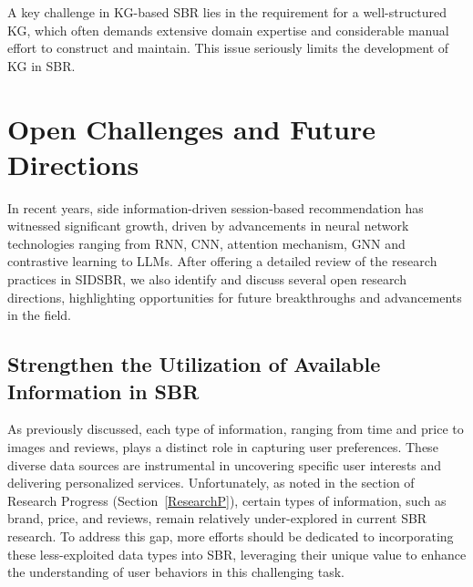 \documentclass[lettersize,journal]{IEEEtran}
\newcommand{\baby}{{SIDSBR}\xspace}
\begin{document}
A key challenge in KG-based SBR lies in the requirement for a well-structured KG, which often demands extensive domain expertise and considerable manual effort to construct and maintain. This issue seriously limits the development of KG in SBR.


\section{Open Challenges and Future Directions}\label{openf}
In recent years, side information-driven session-based recommendation has witnessed significant growth, driven by advancements in neural network technologies ranging from RNN, CNN, attention mechanism, GNN and contrastive learning to LLMs. After offering a detailed review of the research practices in \baby, we also identify and discuss several open research directions, highlighting opportunities for future breakthroughs and advancements in the field.

\subsection{Strengthen the Utilization of Available Information in SBR}
As previously discussed, each type of information, ranging from time and price to images and reviews, plays a distinct role in capturing user preferences. These diverse data sources are instrumental in uncovering specific user interests and delivering personalized services.  Unfortunately, as noted in the section of Research Progress (Section~\ref{ResearchP}), certain types of information, such as brand, price, and reviews, remain relatively under-explored in current SBR research. To address this gap, more efforts should be dedicated to incorporating these less-exploited data types into SBR, leveraging their unique value to enhance the understanding of user behaviors in this challenging task.
\end{document}
